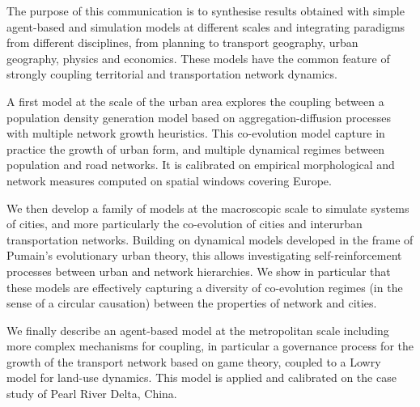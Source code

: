 \documentclass[11pt]{article}
\begin{document}
The purpose of this communication is to synthesise results obtained with simple agent-based and simulation models at different scales and integrating paradigms from different disciplines, from planning to transport geography, urban geography, physics and economics. These models have the common feature of strongly coupling territorial and transportation network dynamics.

A first model at the scale of the urban area explores the coupling between a population density generation model based on aggregation-diffusion processes with multiple network growth heuristics. This co-evolution model capture in practice the growth of urban form, and multiple dynamical regimes between population and road networks. It is calibrated on empirical morphological and network measures computed on spatial windows covering Europe.

We then develop a family of models at the macroscopic scale to simulate systems of cities, and more particularly the co-evolution of cities and interurban transportation networks. Building on dynamical models developed in the frame of Pumain's evolutionary urban theory, this allows investigating self-reinforcement processes between urban and network hierarchies. We show in particular that these models are effectively capturing a diversity of co-evolution regimes (in the sense of a circular causation) between the properties of network and cities.


We finally describe an agent-based model at the metropolitan scale including more complex mechanisms for coupling, in particular a governance process for the growth of the transport network based on game theory, coupled to a Lowry model for land-use dynamics. This model is applied and calibrated on the case study of Pearl River Delta, China.
\end{document}
